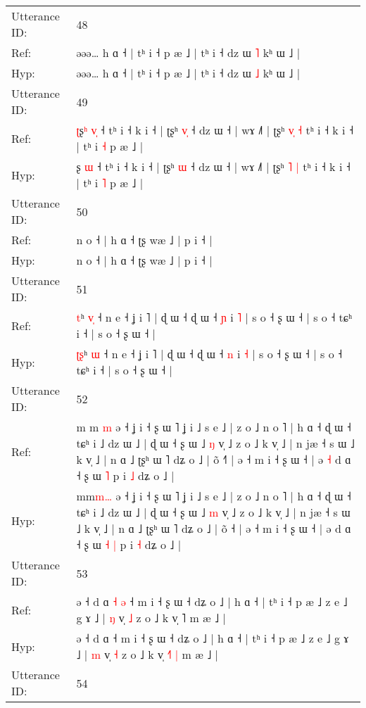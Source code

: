 \documentclass[10pt]{article}
\DeclareRobustCommand{\hl}[1]{{\textcolor{red}{#1}}}
\begin{document}
\begin{longtable}{ll}
 \\
\midrule
Utterance ID: & 48 \\
Ref: & əəə… h ɑ ˧ | tʰ i ˧ p æ ˩ | tʰ i ˧ dz ɯ \hl{˥} kʰ ɯ ˩ |
 \\
Hyp: & əəə… h ɑ ˧ | tʰ i ˧ p æ ˩ | tʰ i ˧ dz ɯ \hl{˩} kʰ ɯ ˩ |
 \\
\midrule
Utterance ID: & 49 \\
Ref: & \hl{ʈ}ʂ\hl{ʰ} \hl{v}\hl{̩} ˧ tʰ i ˧ k i ˧ | ʈʂʰ \hl{v}\hl{̩} ˧ dz ɯ ˧ | wɤ ˩˥ | ʈʂʰ \hl{v}\hl{̩} \hl{˧} tʰ i ˧ k i ˧ | tʰ i \hl{˧} p æ ˩ |
 \\
Hyp: & \hl{}ʂ\hl{} \hl{}\hl{ɯ} ˧ tʰ i ˧ k i ˧ | ʈʂʰ \hl{}\hl{ɯ} ˧ dz ɯ ˧ | wɤ ˩˥ | ʈʂʰ \hl{}\hl{˥} \hl{|} tʰ i ˧ k i ˧ | tʰ i \hl{˥} p æ ˩ |
 \\
\midrule
Utterance ID: & 50 \\
Ref: & n o ˧ | h ɑ ˧ ʈʂ wæ ˩ | p i ˧ |
 \\
Hyp: & n o ˧ | h ɑ ˧ ʈʂ wæ ˩ | p i ˧ |
 \\
\midrule
Utterance ID: & 51 \\
Ref: & \hl{}\hl{t}ʰ \hl{v}\hl{̩} ˧ n e ˧ ʝ i ˥ | ɖ ɯ ˧ ɖ ɯ ˧ \hl{ɲ} i \hl{˥} | s o ˧ ʂ ɯ ˧ | s o ˧ tɕʰ i ˧ | s o ˧ ʂ ɯ ˧ |
 \\
Hyp: & \hl{ʈ}\hl{ʂ}ʰ \hl{}\hl{ɯ} ˧ n e ˧ ʝ i ˥ | ɖ ɯ ˧ ɖ ɯ ˧ \hl{n} i \hl{˧} | s o ˧ ʂ ɯ ˧ | s o ˧ tɕʰ i ˧ | s o ˧ ʂ ɯ ˧ |
 \\
\midrule
Utterance ID: & 52 \\
Ref: & m\hl{ }m\hl{ }\hl{m} ə ˧ ʝ i ˧ ʂ ɯ ˥ ʝ i ˩ s e ˩ | z o ˩ n o ˥ | h ɑ ˧ ɖ ɯ ˧ tɕʰ i ˩ dz ɯ ˩ | ɖ ɯ ˧ ʂ ɯ ˩ \hl{ŋ} v̩ ˩ z o ˩ k v̩ ˩ | n jæ ˧ s ɯ ˩ k v̩ ˩ | n ɑ ˩ ʈʂʰ ɯ ˥ dʑ o ˩ | õ ˧\hl{˥} | ə ˧ m i ˧ ʂ ɯ ˧ | ə\hl{ }\hl{˧} d ɑ ˧ ʂ ɯ\hl{}\hl{} \hl{˥} p i \hl{˩} dʑ o ˩ |
 \\
Hyp: & m\hl{}m\hl{m}\hl{…} ə ˧ ʝ i ˧ ʂ ɯ ˥ ʝ i ˩ s e ˩ | z o ˩ n o ˥ | h ɑ ˧ ɖ ɯ ˧ tɕʰ i ˩ dz ɯ ˩ | ɖ ɯ ˧ ʂ ɯ ˩ \hl{m} v̩ ˩ z o ˩ k v̩ ˩ | n jæ ˧ s ɯ ˩ k v̩ ˩ | n ɑ ˩ ʈʂʰ ɯ ˥ dʑ o ˩ | õ ˧\hl{} | ə ˧ m i ˧ ʂ ɯ ˧ | ə\hl{}\hl{} d ɑ ˧ ʂ ɯ\hl{ }\hl{˧} \hl{|} p i \hl{˧} dʑ o ˩ |
 \\
\midrule
Utterance ID: & 53 \\
Ref: & ə ˧ d ɑ\hl{ }\hl{˧}\hl{ }\hl{ə} ˧ m i ˧ ʂ ɯ ˧ dʑ o ˩ | h ɑ ˧ | tʰ i ˧ p æ ˩ z e ˩ g ɤ ˩ | \hl{ŋ} v̩ \hl{˩} z o ˩ k v̩ \hl{}˥\hl{}\hl{} m æ ˩ |
 \\
Hyp: & ə ˧ d ɑ\hl{}\hl{}\hl{}\hl{} ˧ m i ˧ ʂ ɯ ˧ dʑ o ˩ | h ɑ ˧ | tʰ i ˧ p æ ˩ z e ˩ g ɤ ˩ | \hl{m} v̩ \hl{˧} z o ˩ k v̩ \hl{˧}˥\hl{ }\hl{|} m æ ˩ |
 \\
\midrule
Utterance ID: & 54 \\

\end{longtable}
\end{document}
